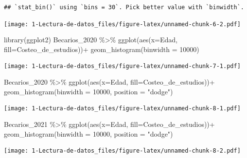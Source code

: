 \documentclass[
]{article}
\newenvironment{Shaded}{\begin{snugshade}}{\end{snugshade}}
\newcommand{\AttributeTok}[1]{\textcolor[rgb]{0.77,0.63,0.00}{#1}}
\newcommand{\DecValTok}[1]{\textcolor[rgb]{0.00,0.00,0.81}{#1}}
\newcommand{\FunctionTok}[1]{\textcolor[rgb]{0.00,0.00,0.00}{#1}}
\newcommand{\NormalTok}[1]{#1}
\newcommand{\SpecialCharTok}[1]{\textcolor[rgb]{0.00,0.00,0.00}{#1}}
\newcommand{\StringTok}[1]{\textcolor[rgb]{0.31,0.60,0.02}{#1}}
\begin{document}
\begin{verbatim}
## `stat_bin()` using `bins = 30`. Pick better value with `binwidth`.
\end{verbatim}

\texttt{[image: 1-Lectura-de-datos\_files/figure-latex/unnamed-chunk-6-2.pdf]}

\begin{Shaded}
\begin{Highlighting}[]
\FunctionTok{library}\NormalTok{(ggplot2)}
\NormalTok{Becarios\_2020 }\SpecialCharTok{\%\textgreater{}\%} 
  \FunctionTok{ggplot}\NormalTok{(}\FunctionTok{aes}\NormalTok{(}\AttributeTok{x=}\NormalTok{Edad, }\AttributeTok{fill=}\NormalTok{Costeo\_de\_estudios))}\SpecialCharTok{+}
  \FunctionTok{geom\_histogram}\NormalTok{(}\AttributeTok{binwidth =} \DecValTok{10000}\NormalTok{)}
\end{Highlighting}
\end{Shaded}

\texttt{[image: 1-Lectura-de-datos\_files/figure-latex/unnamed-chunk-7-1.pdf]}

\begin{Shaded}
\begin{Highlighting}[]
\NormalTok{Becarios\_2020 }\SpecialCharTok{\%\textgreater{}\%} 
  \FunctionTok{ggplot}\NormalTok{(}\FunctionTok{aes}\NormalTok{(}\AttributeTok{x=}\NormalTok{Edad, }\AttributeTok{fill=}\NormalTok{Costeo\_de\_estudios))}\SpecialCharTok{+}
  \FunctionTok{geom\_histogram}\NormalTok{(}\AttributeTok{binwidth =} \DecValTok{10000}\NormalTok{, }\AttributeTok{position =} \StringTok{"dodge"}\NormalTok{)}
\end{Highlighting}
\end{Shaded}

\texttt{[image: 1-Lectura-de-datos\_files/figure-latex/unnamed-chunk-8-1.pdf]}

\begin{Shaded}
\begin{Highlighting}[]
\NormalTok{Becarios\_2021 }\SpecialCharTok{\%\textgreater{}\%} 
  \FunctionTok{ggplot}\NormalTok{(}\FunctionTok{aes}\NormalTok{(}\AttributeTok{x=}\NormalTok{Edad, }\AttributeTok{fill=}\NormalTok{Costeo\_de\_estudios))}\SpecialCharTok{+}
  \FunctionTok{geom\_histogram}\NormalTok{(}\AttributeTok{binwidth =} \DecValTok{10000}\NormalTok{, }\AttributeTok{position =} \StringTok{"dodge"}\NormalTok{)}
\end{Highlighting}
\end{Shaded}

\texttt{[image: 1-Lectura-de-datos\_files/figure-latex/unnamed-chunk-8-2.pdf]}
\end{document}
